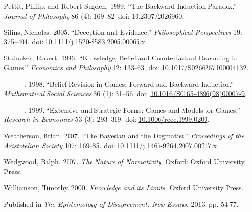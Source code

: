 \documentclass[
  10pt,
  letterpaper,
  DIV=11,
  numbers=noendperiod,
  twoside]{scrartcl}
\newlength{\cslhangindent}
\newenvironment{CSLReferences}[2] %
 {\begin{list}{}{%
  \setlength{\itemindent}{0pt}
  \setlength{\leftmargin}{0pt}
  \setlength{\parsep}{0pt}
  \ifodd #1
   \setlength{\leftmargin}{\cslhangindent}
   \setlength{\itemindent}{-1\cslhangindent}
  \fi
  \setlength{\itemsep}{#2\baselineskip}}}
 {\end{list}}
\begin{document}
\begin{CSLReferences}{1}{0}
Pettit, Philip, and Robert Sugden. 1989. {``The Backward Induction
Paradox.''} \emph{Journal of Philosophy} 86 (4): 169--82. doi:
\href{https://doi.org/10.2307/2026960}{10.2307/2026960}.

Silins, Nicholas. 2005. {``Deception and Evidence.''}
\emph{Philosophical Perspectives} 19: 375--404. doi:
\href{https://doi.org/10.1111/j.1520-8583.2005.00066.x}{10.1111/j.1520-8583.2005.00066.x}.

Stalnaker, Robert. 1996. {``Knowledge, Belief and Counterfactual
Reasoning in Games.''} \emph{Economics and Philosophy} 12: 133--63. doi:
\href{https://doi.org/10.1017/S0266267100004132}{10.1017/S0266267100004132}.

---------. 1998. {``Belief Revision in Games: Forward and Backward
Induction.''} \emph{Mathematical Social Sciences} 36 (1): 31--56. doi:
\href{https://doi.org/10.1016/S0165-4896(98)00007-9}{10.1016/S0165-4896(98)00007-9}.

---------. 1999. {``Extensive and Strategic Forms: Games and Models for
Games.''} \emph{Research in Economics} 53 (3): 293--319. doi:
\href{https://doi.org/10.1006/reec.1999.0200}{10.1006/reec.1999.0200}.

Weatherson, Brian. 2007. {``The Bayesian and the Dogmatist.''}
\emph{Proceedings of the Aristotelian Society} 107: 169--85. doi:
\href{https://doi.org/10.1111/j.1467-9264.2007.00217.x}{10.1111/j.1467-9264.2007.00217.x}.

Wedgwood, Ralph. 2007. \emph{The Nature of Normativity}. Oxford: Oxford
University Press.

Williamson, Timothy. 2000. \emph{{Knowledge and its Limits}}. Oxford
University Press.

\end{CSLReferences}



\noindent Published in\emph{
The Epistemology of Disagreement: New Essays}, 2013, pp. 54-77.
\end{document}
